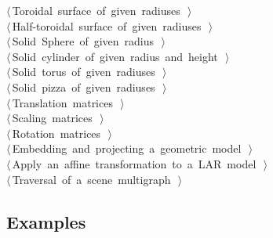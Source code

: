 \documentclass[11pt,oneside]{article}	%
\begin{document}
\begin{flushleft}
\begin{list}{}{}
\mbox{}\verb@@\hbox{$\langle\,$Toroidal surface of given radiuses\nobreak\ {\footnotesize {}}$\,\rangle$}\verb@@\\
\mbox{}\verb@@\hbox{$\langle\,$Half-toroidal surface of given radiuses\nobreak\ {\footnotesize {}}$\,\rangle$}\verb@@\\
\mbox{}\verb@@\hbox{$\langle\,$Solid Sphere of given radius\nobreak\ {\footnotesize {}}$\,\rangle$}\verb@@\\
\mbox{}\verb@@\hbox{$\langle\,$Solid cylinder of given radius and height\nobreak\ {\footnotesize {}}$\,\rangle$}\verb@@\\
\mbox{}\verb@@\hbox{$\langle\,$Solid torus of given radiuses\nobreak\ {\footnotesize {}}$\,\rangle$}\verb@@\\
\mbox{}\verb@@\hbox{$\langle\,$Solid pizza of given radiuses\nobreak\ {\footnotesize {}}$\,\rangle$}\verb@@\\
\mbox{}\verb@@\hbox{$\langle\,$Translation matrices\nobreak\ {\footnotesize {}}$\,\rangle$}\verb@@\\
\mbox{}\verb@@\hbox{$\langle\,$Scaling matrices\nobreak\ {\footnotesize {}}$\,\rangle$}\verb@@\\
\mbox{}\verb@@\hbox{$\langle\,$Rotation matrices\nobreak\ {\footnotesize {}}$\,\rangle$}\verb@@\\
\mbox{}\verb@@\hbox{$\langle\,$Embedding and projecting a geometric model\nobreak\ {\footnotesize {}}$\,\rangle$}\verb@@\\
\mbox{}\verb@@\hbox{$\langle\,$Apply an affine transformation to a LAR model\nobreak\ {\footnotesize {}}$\,\rangle$}\verb@@\\
\mbox{}\verb@@\hbox{$\langle\,$Traversal of a scene multigraph\nobreak\ {\footnotesize {}}$\,\rangle$}\verb@@\\
\mbox{}\verb@@{\NWsep}
\end{list}
\vspace{-2ex}
\end{flushleft}
\subsection{Examples}
\end{document}
